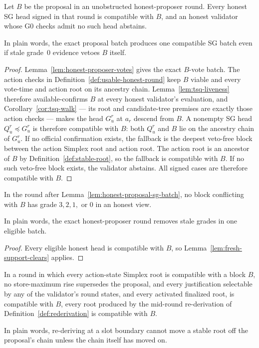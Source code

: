 \begin{lemma}
\label{lem:honest-proposal-sg-batch}
Let \(B\) be the proposal in an unobstructed honest-proposer round.  Every honest
SG head signed in that round is compatible with \(B\), and an honest
validator whose G0 checks admit no such head abstains.

In plain words, the exact proposal batch produces one compatible SG batch
even if stale grade~0 evidence vetoes \(B\) itself.
\end{lemma}

\begin{proof}
Lemma~\ref{lem:honest-proposer-votes} gives the exact \(B\)-vote batch.
The action checks in Definition~\ref{def:usable-honest-round} keep \(B\)
viable and every vote-time and action root on its ancestry chain.
Lemma~\ref{lem:tsq-liveness} therefore available-confirms \(B\) at every
honest validator's evaluation, and Corollary~\ref{cor:tsq-walk} --- its
root and candidate-tree premises are exactly those action checks --- makes
the head \(G_u^r\) at \(a_r\) descend from \(B\).  A nonempty SG head
\(Q_u^r\preceq G_u^r\) is therefore compatible with \(B\): both \(Q_u^r\)
and \(B\) lie on the ancestry chain of \(G_u^r\).
If no official confirmation exists, the fallback is the deepest veto-free
block between the action Simplex root and action root.  The action root is an
ancestor of \(B\) by Definition~\ref{def:stable-root}, so the fallback is compatible with
\(B\).  If no such veto-free block exists, the validator abstains.
All signed cases are therefore compatible with \(B\).
\end{proof}

\begin{lemma}
\label{lem:next-batch-clears}
In the round after Lemma~\ref{lem:honest-proposal-sg-batch}, no block
conflicting with \(B\) has grade \(3,2,1,\) or \(0\) in an honest view.

In plain words, the exact honest-proposer round removes stale grades in one
eligible batch.
\end{lemma}

\begin{proof}
Every eligible honest head is compatible with \(B\), so
Lemma~\ref{lem:fresh-support-clears} applies.
\end{proof}

\begin{lemma}
\label{lem:rederivation-ancestry}
In a round in which every action-state Simplex root is compatible with
a block \(B\), no store-maximum rise supersedes the proposal, and every
justification selectable by any of the validator's round states, and
every activated finalized root, is compatible with \(B\), every
root produced by the mid-round re-derivation of
Definition~\ref{def:rederivation} is compatible with \(B\).

In plain words, re-deriving at a slot boundary cannot move a stable root
off the proposal's chain unless the chain itself has moved on.
\end{lemma}

